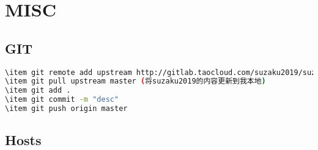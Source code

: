 \chapter{MISC}

\section{GIT}

\begin{lstlisting}[language=bash,frame=single]
\item git remote add upstream http://gitlab.taocloud.com/suzaku2019/suzaku.git
\item git pull upstream master (将suzaku2019的内容更新到我本地)
\item git add .
\item git commit -m "desc"
\item git push origin master
\end{lstlisting}

\section{Hosts}
